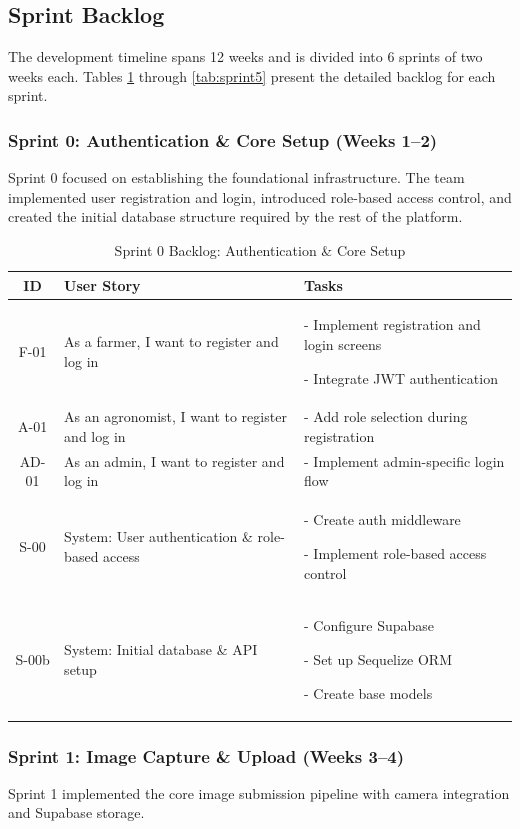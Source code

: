 \documentclass[12pt]{article}
\begin{document}
\subsection{Sprint Backlog}
The development timeline spans 12 weeks and is divided into 6 sprints of two weeks each. Tables \ref{tab:sprint0} through \ref{tab:sprint5} present the detailed backlog for each sprint.

\subsubsection*{Sprint 0: Authentication \& Core Setup (Weeks 1--2)}
Sprint 0 focused on establishing the foundational infrastructure. The team implemented user registration and login, introduced role-based access control, and created the initial database structure required by the rest of the platform.

\begin{table}[H]
\centering
\caption{Sprint 0 Backlog: Authentication \& Core Setup}
\label{tab:sprint0}
\begin{tabular}{|c|p{8cm}|p{8cm}|}
\hline
\textbf{ID} & \textbf{User Story} & \textbf{Tasks} \\
\hline
F-01 & As a farmer, I want to register and log in & - Implement registration and login screens \par - Integrate JWT authentication \\
\hline
A-01 & As an agronomist, I want to register and log in & - Add role selection during registration \\
\hline
AD-01 & As an admin, I want to register and log in & - Implement admin-specific login flow \\
\hline
S-00 & System: User authentication \& role-based access & - Create auth middleware \par - Implement role-based access control \\
\hline
S-00b & System: Initial database \& API setup & - Configure Supabase \par - Set up Sequelize ORM \par - Create base models \\
\hline
\end{tabular}
\end{table}

\subsubsection*{Sprint 1: Image Capture \& Upload (Weeks 3--4)}
Sprint 1 implemented the core image submission pipeline with camera integration and Supabase storage.
\end{document}
